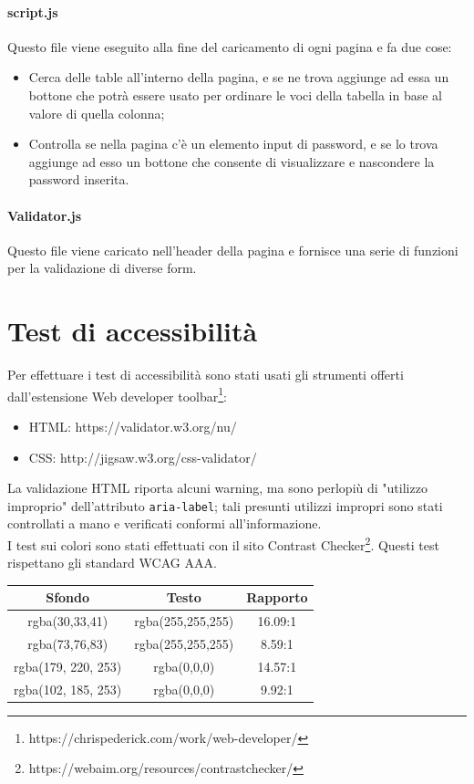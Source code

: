 \documentclass[12pt, a4paper]{article}
\begin{document}
    \paragraph{script.js} Questo file viene eseguito alla fine del caricamento di ogni pagina e fa due cose:
    \begin{itemize}
        \item Cerca delle table all'interno della pagina, e se ne trova aggiunge ad essa un bottone che potrà essere usato per ordinare le voci della tabella in base al valore di quella colonna;
        \item Controlla se nella pagina c'è un elemento input di password, e se lo trova aggiunge ad esso un bottone che consente di visualizzare e nascondere la password inserita.
    \end{itemize}

    \paragraph{Validator.js} Questo file viene caricato nell'header della pagina e fornisce una serie di funzioni per la validazione di diverse form.


    \section{Test di accessibilità}
    Per effettuare i test di accessibilità sono stati usati gli strumenti offerti dall'estensione Web developer toolbar\footnote{https://chrispederick.com/work/web-developer/}:
    \begin{itemize}
        \item HTML: https://validator.w3.org/nu/
        \item CSS: http://jigsaw.w3.org/css-validator/
    \end{itemize}

    La validazione HTML riporta alcuni warning, ma sono perlopiù di "utilizzo improprio" dell'attributo \texttt{aria-label}; tali presunti utilizzi impropri sono stati controllati a mano e verificati conformi all'informazione.
    \\ 
    I test sui colori sono stati effettuati con il sito Contrast Checker\footnote{https://webaim.org/resources/contrastchecker/}. Questi test rispettano gli standard WCAG AAA.
    \begin{center}
    \begin{tabular}{c|c|c}
    Sfondo & Testo & Rapporto \\
    \hline
    rgba(30,33,41) & rgba(255,255,255) & 16.09:1 \\
    rgba(73,76,83) & rgba(255,255,255) & 8.59:1 \\
    rgba(179, 220, 253) & rgba(0,0,0) & 14.57:1 \\
    rgba(102, 185, 253) & rgba(0,0,0) & 9.92:1 
    \end{tabular}
\end{center}
\end{document}
